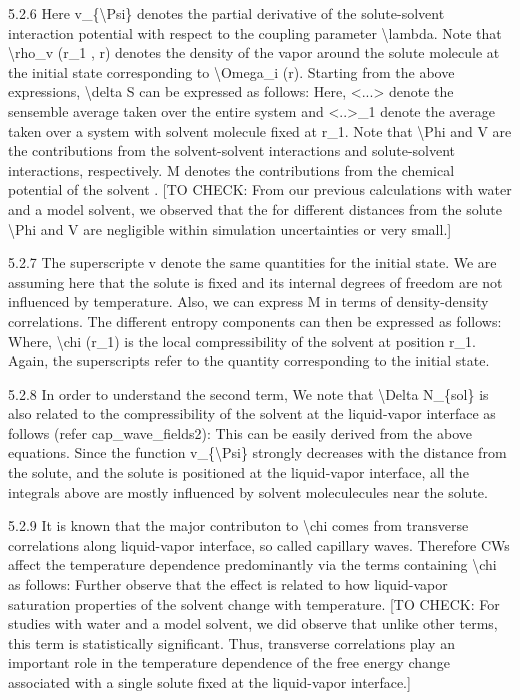\par 5.2.6 Here v\_\{\textbackslash Psi\} denotes the partial derivative of the solute-solvent interaction potential with respect to the coupling parameter \textbackslash lambda. Note that \textbackslash rho\_v (r\_1 , r) denotes the density of the vapor around the solute molecule at the initial state corresponding to \textbackslash Omega\_i (r). Starting from the above expressions, \textbackslash delta S can be expressed as follows: Here, <...> denote the sensemble average taken over the entire system and <..>\_1 denote the average taken over a system with solvent molecule fixed at r\_1.  Note that \textbackslash Phi and V are the contributions from the solvent-solvent interactions and solute-solvent interactions, respectively. M denotes the contributions from the chemical potential of the solvent . [TO CHECK: From our previous calculations with water and a model solvent, we observed that the for different distances from the solute \textbackslash Phi and V are negligible within simulation uncertainties or very small.]
\par 5.2.7 The superscripte v denote the same quantities for the initial state. We are assuming here that the solute is fixed and its internal degrees of freedom are not influenced by temperature. Also, we can express M in terms of density-density correlations. The different entropy components can then be expressed as follows: Where, \textbackslash chi (r\_1) is the local compressibility of the solvent at position r\_1. Again, the superscripts  refer to the quantity corresponding to the initial state.
\par 5.2.8 In order to understand the second term, We note that \textbackslash Delta N\_\{sol\} is also related to the compressibility of the solvent at the liquid-vapor interface as follows (refer cap\_wave\_fields2):  This can be easily derived from the above equations. Since the function v\_\{\textbackslash Psi\} strongly decreases with the distance from the solute, and the solute is positioned at the liquid-vapor interface, all the integrals above are mostly influenced by solvent moleculecules near the solute.
\par 5.2.9  It is known that the major contributon to \textbackslash chi comes from transverse correlations along liquid-vapor interface, so called capillary waves. Therefore CWs affect the temperature dependence predominantly via the terms containing \textbackslash chi as follows: Further observe that the effect is related to how liquid-vapor saturation properties of the solvent change with temperature. [TO CHECK: For studies with water and a model solvent, we did observe that unlike other terms, this term is statistically significant. Thus, transverse correlations play an important role in the temperature dependence of the free energy change associated with a single solute fixed at the liquid-vapor interface.]
